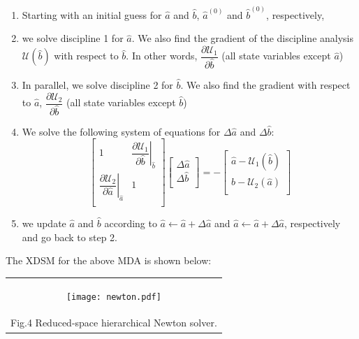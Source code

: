 \documentclass[11pt]{article}
\providecommand{\tightlist}{%
      \setlength{\itemsep}{0pt}\setlength{\parskip}{0pt}}
\begin{document}
\begin{enumerate}
\def\labelenumi{\arabic{enumi})}
\tightlist
\item
  Starting with an initial guess for \(\hat{a}\) and \(\hat{b}\),
  \(\hat{a}^{(0)}\) and \(\hat{b}^{(0)}\), respectively,
\item
  we solve discipline 1 for \(\hat{a}\). We also find the gradient of
  the discipline analysis \(\mathcal{U}(\hat{b})\) with respect to
  \(\hat{b}\). In other words,
  \(\dfrac{\partial\mathcal{U}_1}{\partial\hat{b}}\) (all state
  variables except \(\hat{a}\))
\item
  In parallel, we solve discipline 2 for \(\hat{b}\). We also find the
  gradient with respect to \(\hat{a}\),
  \(\dfrac{\partial\mathcal{U}_2}{\partial\hat{b}}\) (all state
  variables except \(\hat{b}\))
\item
  We solve the following system of equations for \(\Delta\hat{a}\) and
  \(\Delta\hat{b}\): \[
  \begin{bmatrix}
   1       & \left.\dfrac{\partial\mathcal{U}_1}{\partial\hat{b}}\right|_{\hat{b}}  \\
   \left.\dfrac{\partial\mathcal{U}_2}{\partial\hat{a}}\right|_{\hat{a}}        & 1  \\
  \end{bmatrix}
  \begin{bmatrix}
   \Delta\hat{a}\\
   \Delta\hat{b}\\
  \end{bmatrix} = -
  \begin{bmatrix}
   \hat{a} - \mathcal{U}_1(\hat{b})\\
   \hat{b} - \mathcal{U}_2(\hat{a})\\
  \end{bmatrix}
  \]
\item
  we update \(\hat{a}\) and \(\hat{b}\) according to
  \(\hat{a} \gets \hat{a} + \Delta\hat{a}\) and
  \(\hat{a} \gets \hat{a} + \Delta\hat{a}\), respectively and go back to
  step 2.
\end{enumerate}

The XDSM for the above MDA is shown below:

\begin{longtable}[]{@{}c@{}}
\toprule
\endhead
\begin{minipage}[t]{0.97\columnwidth}\centering
    \begin{figure}
        \centering
        \texttt{[image: newton.pdf]}
    \end{figure}
\end{minipage}\tabularnewline
Fig.4 Reduced-space hierarchical Newton solver.\tabularnewline
\bottomrule
\end{longtable}
\end{document}
